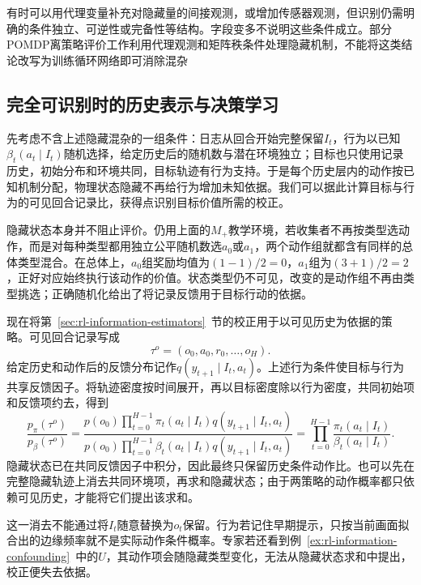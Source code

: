 有时可以用代理变量补充对隐藏量的间接观测，或增加传感器观测，但识别仍需明确的条件独立、可逆性或完备性等结构。字段变多不说明这些条件成立。部分POMDP离策略评价工作利用代理观测和矩阵秩条件处理隐藏机制，不能将这类结论改写为训练循环网络即可消除混杂

\subsection{完全可识别时的历史表示与决策学习}
\label{sec:rl-information-full-identification}

先考虑不含上述隐藏混杂的一组条件：日志从回合开始完整保留$I_t$，行为以已知$\beta_t(a_t\mid I_t)$随机选择，给定历史后的随机数与潜在环境独立；目标也只使用记录历史，初始分布和环境共同，目标轨迹有行为支持。于是每个历史层内的动作按已知机制分配，物理状态隐藏不再给行为增加未知依据。我们可以据此计算目标与行为的可见回合记录比，获得点识别目标价值所需的校正。

隐藏状态本身并不阻止评价。仍用上面的$M_+$教学环境，若收集者不再按类型选动作，而是对每种类型都用独立公平随机数选$a_0$或$a_1$，两个动作组就都含有同样的总体类型混合。在总体上，$a_0$组奖励均值为$(1-1)/2=0$，$a_1$组为$(3+1)/2=2$，正好对应始终执行该动作的价值。状态类型仍不可见，改变的是动作组不再由类型挑选；正确随机化给出了将记录反馈用于目标行动的依据。

现在将第~\ref{sec:rl-information-estimators}~节的校正用于以可见历史为依据的策略。可见回合记录写成
\[
  \tau^o=(o_0,a_0,r_0,\ldots,o_H).
\]
给定历史和动作后的反馈分布记作$q(y_{t+1}\mid I_t,a_t)$。上述行为条件使目标与行为共享反馈因子。将轨迹密度按时间展开，再以目标密度除以行为密度，共同初始项和反馈项约去，得到
\begin{equation}
  \label{eq:rl-information-history-is}
  \frac{p_\pi(\tau^o)}{p_\beta(\tau^o)}
   =\frac{p(o_0)\prod_{t=0}^{H-1}
                  \pi_t(a_t\mid I_t)q(y_{t+1}\mid I_t,a_t)}
          {p(o_0)\prod_{t=0}^{H-1}
                  \beta_t(a_t\mid I_t)q(y_{t+1}\mid I_t,a_t)}
   =\prod_{t=0}^{H-1}\frac{\pi_t(a_t\mid I_t)}
                              {\beta_t(a_t\mid I_t)}.
\end{equation}
隐藏状态已在共同反馈因子中积分，因此最终只保留历史条件动作比。也可以先在完整隐藏轨迹上消去共同环境项，再求和隐藏状态；由于两策略的动作概率都只依赖可见历史，才能将它们提出该求和。

这一消去不能通过将$I_t$随意替换为$o_t$保留。行为若记住早期提示，只按当前画面拟合出的边缘频率就不是实际动作条件概率。专家若还看到例~\ref{ex:rl-information-confounding}~中的$U$，其动作项会随隐藏类型变化，无法从隐藏状态求和中提出，校正便失去依据。

